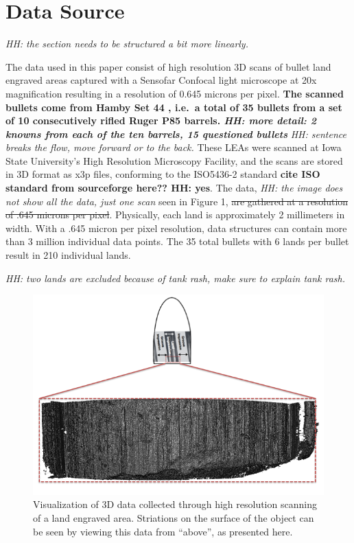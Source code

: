 \documentclass[]{article}
\begin{document}
\section{Data Source}

\emph{HH: the section needs to be structured a bit more linearly. }

The data used in this paper consist of high resolution 3D scans of
bullet land engraved areas captured with a Sensofar Confocal light
microscope at 20x magnification resulting in a resolution of 0.645
microns per pixel. \textbf{The scanned bullets come from Hamby Set 44
\citep{Hamby}, i.e.~a total of 35 bullets from a set of 10 consecutively
rifled Ruger P85 barrels. \emph{HH: more detail: 2 knowns from each of
the ten barrels, 15 questioned bullets}} \emph{HH: sentence breaks the
flow, move forward or to the back.} These LEAs were scanned at Iowa
State University's High Resolution Microscopy Facility, and the scans
are stored in 3D format as x3p files, conforming to the ISO5436-2
standard \textbf{cite ISO standard from sourceforge here?? HH: yes}. The
data, \emph{HH: the image does not show all the data, just one scan}
seen in Figure 1, \sout{are gathered at a resolution of .645 microns per
pixel}. Physically, each land is approximately 2 millimeters in width.
With a .645 micron per pixel resolution, data structures can contain
more than 3 million individual data points. The 35 total bullets with 6
lands per bullet result in 210 individual lands.

\emph{HH: two lands are excluded because of tank rash, make sure to
explain tank rash.}

\begin{figure}
\centering
\includegraphics[width=6.25000in]{./images/3d_plot_top_context.png}
\caption{Visualization of 3D data collected through high resolution
scanning of a land engraved area. Striations on the surface of the
object can be seen by viewing this data from ``above'', as presented
here.}
\end{figure}
\end{document}
